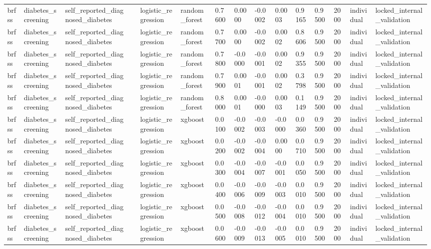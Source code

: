 \begin{tabular}{lllllllllllllll}
brfss & diabetes\_screening & self\_reported\_diagnosed\_diabetes &  & logistic\_regression & random\_forest & 0.7600 & 0.0000 & -0.0002 & 0.0003 & 0.9165 & 0.9500 & 2000 & individual & locked\_internal\_validation \\
brfss & diabetes\_screening & self\_reported\_diagnosed\_diabetes &  & logistic\_regression & random\_forest & 0.7700 & 0.0000 & -0.0002 & 0.0002 & 0.8606 & 0.9500 & 2000 & individual & locked\_internal\_validation \\
brfss & diabetes\_screening & self\_reported\_diagnosed\_diabetes &  & logistic\_regression & random\_forest & 0.7800 & -0.0000 & -0.0001 & 0.0002 & 0.9355 & 0.9500 & 2000 & individual & locked\_internal\_validation \\
brfss & diabetes\_screening & self\_reported\_diagnosed\_diabetes &  & logistic\_regression & random\_forest & 0.7900 & 0.0001 & -0.0001 & 0.0002 & 0.3798 & 0.9500 & 2000 & individual & locked\_internal\_validation \\
brfss & diabetes\_screening & self\_reported\_diagnosed\_diabetes &  & logistic\_regression & random\_forest & 0.8000 & 0.0001 & -0.0000 & 0.0003 & 0.1149 & 0.9500 & 2000 & individual & locked\_internal\_validation \\
brfss & diabetes\_screening & self\_reported\_diagnosed\_diabetes &  & logistic\_regression & xgboost & 0.0100 & -0.0002 & -0.0003 & -0.0000 & 0.0360 & 0.9500 & 2000 & individual & locked\_internal\_validation \\
brfss & diabetes\_screening & self\_reported\_diagnosed\_diabetes &  & logistic\_regression & xgboost & 0.0200 & -0.0002 & -0.0004 & 0.0000 & 0.0710 & 0.9500 & 2000 & individual & locked\_internal\_validation \\
brfss & diabetes\_screening & self\_reported\_diagnosed\_diabetes &  & logistic\_regression & xgboost & 0.0300 & -0.0004 & -0.0007 & -0.0001 & 0.0050 & 0.9500 & 2000 & individual & locked\_internal\_validation \\
brfss & diabetes\_screening & self\_reported\_diagnosed\_diabetes &  & logistic\_regression & xgboost & 0.0400 & -0.0006 & -0.0009 & -0.0003 & 0.0010 & 0.9500 & 2000 & individual & locked\_internal\_validation \\
brfss & diabetes\_screening & self\_reported\_diagnosed\_diabetes &  & logistic\_regression & xgboost & 0.0500 & -0.0008 & -0.0012 & -0.0004 & 0.0010 & 0.9500 & 2000 & individual & locked\_internal\_validation \\
brfss & diabetes\_screening & self\_reported\_diagnosed\_diabetes &  & logistic\_regression & xgboost & 0.0600 & -0.0009 & -0.0013 & -0.0005 & 0.0010 & 0.9500 & 2000 & individual & locked\_internal\_validation \\

\end{tabular}
